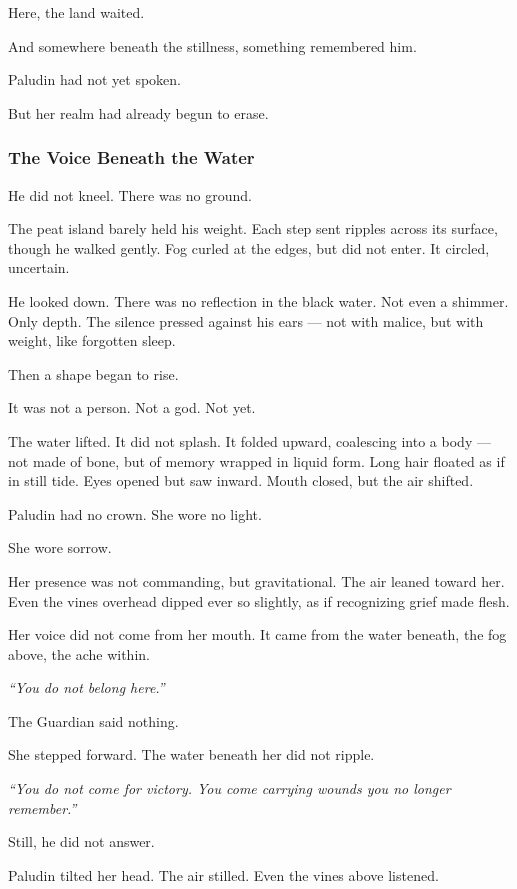 \documentclass[12pt]{article}
\begin{document}
Here, the land waited.

And somewhere beneath the stillness, something remembered him.

Paludin had not yet spoken.

But her realm had already begun to erase.

\dotfill

\subsubsection*{The Voice Beneath the Water}

He did not kneel. There was no ground.

The peat island barely held his weight. Each step sent ripples across its surface, though he walked gently. Fog curled at the edges, but did not enter. It circled, uncertain.

He looked down. There was no reflection in the black water. Not even a shimmer. Only depth. The silence pressed against his ears — not with malice, but with weight, like forgotten sleep.

Then a shape began to rise.

It was not a person. Not a god. Not yet.

The water lifted. It did not splash. It folded upward, coalescing into a body — not made of bone, but of memory wrapped in liquid form. Long hair floated as if in still tide. Eyes opened but saw inward. Mouth closed, but the air shifted.

Paludin had no crown. She wore no light.

She wore sorrow.

Her presence was not commanding, but gravitational. The air leaned toward her. Even the vines overhead dipped ever so slightly, as if recognizing grief made flesh.

Her voice did not come from her mouth. It came from the water beneath, the fog above, the ache within.

\textit{``You do not belong here.''}

The Guardian said nothing.

She stepped forward. The water beneath her did not ripple.

\textit{``You do not come for victory. You come carrying wounds you no longer remember.''}

Still, he did not answer.

Paludin tilted her head. The air stilled. Even the vines above listened.
\end{document}
